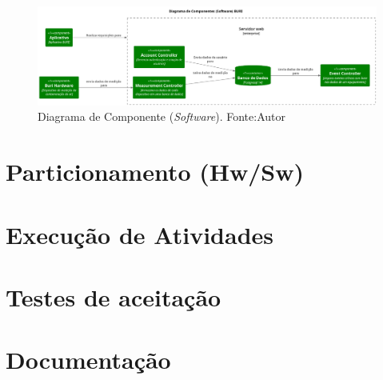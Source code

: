 \begin{figure}[ht]
    \centering
    \includegraphics[width=.94\textwidth]{img/component-diagram-software.png}
    \caption{Diagrama de Componente (\textit{Software}). Fonte:Autor}\label{figComponentSoftware}
\end{figure}

\section{Particionamento (Hw/Sw)}\label{fase3}

\section{Execução de Atividades}\label{fase4}

\section{Testes de aceitação}\label{fase5}

\section{Documentação}\label{fase6}
